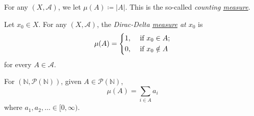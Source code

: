 \begin{eg}\label{eg:counting-measure}
	For any \((X, \mathcal{A})\), we let \(\mu(A) \coloneqq \vert A \vert\). This is the so-called \emph{counting \hyperref[def:measure]{measure}}.
\end{eg}
\begin{eg}\label{eg:Dirac-Delta measure}
	Let \(x_0\in X\). For any \((X, \mathcal{A})\), the \emph{Dirac-Delta \hyperref[def:measure]{measure} at \(x_0\)} is
	\[
		\mu(A) = \begin{dcases}
			1, & \text{ if } x_0\in A;   \\
			0, & \text{ if } x_0\notin A
		\end{dcases}
	\]
	for every \(A\in \mathcal{A} \).
\end{eg}
\begin{eg}
	For \((\mathbb{N}, \mathcal{P} (\mathbb{N} ))\), given \(A\in \mathcal{P} (\mathbb{N} )\),
	\[
		\mu(A) = \sum_{i\in A}a_{i}
	\]
	where \(a_1, a_2, \dots \in [0, \infty) \).
\end{eg}